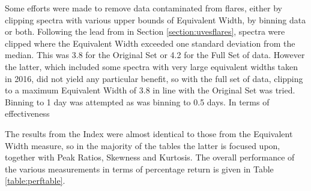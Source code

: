 Some efforts were made to remove data contaminated from flares, either by clipping spectra with various upper bounds of
Equivalent Width, by binning data or both. Following the lead from {\uves} in Section \ref{section:uvesflares}, spectra
were clipped where the Equivalent Width exceeded one standard deviation from the median. This was 3.8 for the Original
Set or 4.2 for the Full Set of data. However the latter, which included some spectra with very large equivalent widths
taken in 2016, did not yield any particular benefit, so with the full set of data, clipping to a maximum Equivalent
Width of 3.8 in line with the Original Set was tried. Binning to 1 day was attempted as was binning to 0.5 days. In
terms of effectiveness 

The results from the {\ha} Index were almost identical to those from the Equivalent Width measure, so in the majority of
the tables the latter is focused upon, together with Peak Ratios, Skewness and Kurtosis. The overall performance of the
various measurements in terms of percentage return is given in Table \ref{table:perftable}.

\begin{table}[!htbp]
\centering
{}
\caption{This table shows the approximate recovery performance of all line measurement methods employed with the
  original and full data. All clipping and binning of the data is included in the summary. As several measures return
  periods close to 41.3 days, or half the period of 82.6 days, the performance of that is shown in the data also.}
\protect\label{table:perftable}
\end{table}

